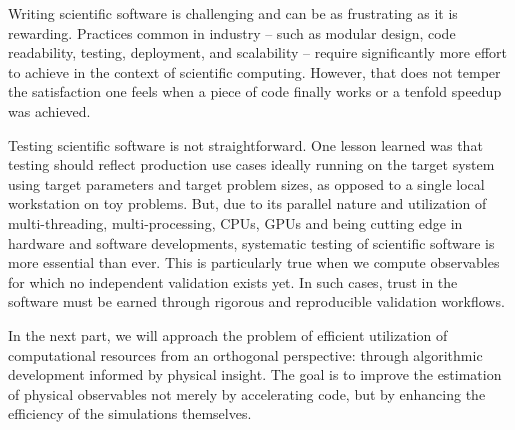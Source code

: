 Writing scientific software is challenging and can be as frustrating as it is rewarding.
Practices common in industry -- such as modular design, code readability, testing, deployment, and scalability -- require significantly more effort to achieve in the context of scientific computing.
However, that does not temper the satisfaction one feels when a piece of code finally works or a tenfold speedup was achieved.

Testing scientific software is not straightforward.
One lesson learned was that testing should reflect production use cases ideally running on the target system using target parameters and target problem sizes, as opposed to a single local workstation on toy problems.
But, due to its parallel nature and utilization of multi-threading, multi-processing, CPUs, GPUs and being cutting edge in hardware and software developments, systematic testing of scientific software is more essential than ever.
This is particularly true when we compute observables for which no independent validation exists yet.
In such cases, trust in the software must be earned through rigorous and reproducible validation workflows.

In the next part, we will approach the problem of efficient utilization of computational resources from an orthogonal perspective: through algorithmic development informed by physical insight.
The goal is to improve the estimation of physical observables not merely by accelerating code, but by enhancing the efficiency of the simulations themselves.

